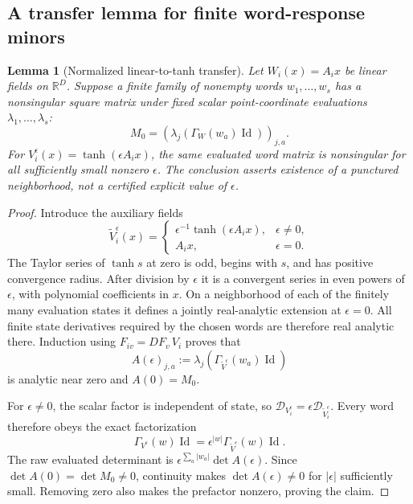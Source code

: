 \documentclass[11pt,a4paper]{article}
\numberwithin{equation}{section}
\newtheorem{lemma}[theorem]{Lemma}
\theoremstyle{definition}
\theoremstyle{remark}
\DeclareMathOperator{\Id}{Id}
\newcommand{\R}{\mathbb R}
\newcommand{\Dop}{\mathcal D}
\begin{document}
\subsection{A transfer lemma for finite word-response minors}
\begin{lemma}[Normalized linear-to-tanh transfer]\label{lem:transfer}
Let $W_i(x)=A_ix$ be linear fields on $\R^D$. Suppose a finite family
of nonempty words $w_1,\ldots,w_s$ has a nonsingular square matrix under
fixed scalar point-coordinate evaluations $\lambda_1,\ldots,\lambda_s$:
\[
 M_0=(\lambda_j(\Gamma_W(w_a)\Id))_{j,a}.
\]
For $V_i^\epsilon(x)=\tanh(\epsilon A_ix)$, the same evaluated word
matrix is nonsingular for all sufficiently small nonzero $\epsilon$.
The conclusion asserts existence of a punctured neighborhood, not a
certified explicit value of $\epsilon$.
\end{lemma}
\begin{proof}
Introduce the auxiliary fields
\begin{equation}\label{eq:normalized}
 \widetilde V_i^\epsilon(x)=
 \begin{cases}\epsilon^{-1}\tanh(\epsilon A_ix),&\epsilon\ne0,\\
 A_ix,&\epsilon=0.
 \end{cases}
\end{equation}
The Taylor series of $\tanh s$ at zero is odd, begins with $s$, and has
positive convergence radius. After division by $\epsilon$ it is a
convergent series in even powers of $\epsilon$, with polynomial
coefficients in $x$. On a neighborhood of each of the finitely many
evaluation states it defines a jointly real-analytic extension at
$\epsilon=0$. All finite state derivatives required by the chosen words
are therefore real analytic there. Induction using
$F_{iv}=DF_v\,V_i$ proves that
\[
 A(\epsilon)_{j,a}:=\lambda_j
 (\Gamma_{\widetilde V^\epsilon}(w_a)\Id)
\]
is analytic near zero and $A(0)=M_0$.

For $\epsilon\ne0$, the scalar factor is independent of state, so
$\Dop_{V_i^\epsilon}=\epsilon\Dop_{\widetilde V_i^\epsilon}$.
Every word therefore obeys the exact factorization
\begin{equation}\label{eq:epsfactor}
 \Gamma_{V^\epsilon}(w)\Id
 =\epsilon^{|w|}\Gamma_{\widetilde V^\epsilon}(w)\Id.
\end{equation}
The raw evaluated determinant is
$\epsilon^{\sum_a|w_a|}\det A(\epsilon)$.
Since $\det A(0)=\det M_0\ne0$, continuity makes
$\det A(\epsilon)\ne0$ for $|\epsilon|$ sufficiently small. Removing
zero also makes the prefactor nonzero, proving the claim.
\end{proof}
\end{document}
